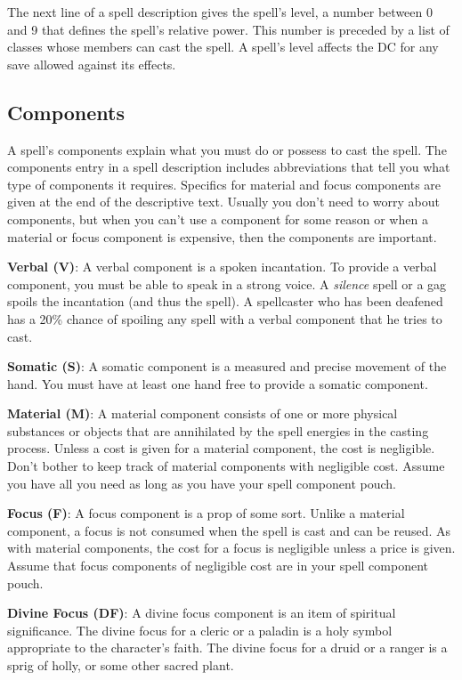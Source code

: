 				
The next line of a spell description gives the spell's level, a number between 0 and 9 that defines the spell's relative power. This number is preceded by a list of classes whose members can cast the spell. A spell's level affects the DC for any save allowed against its effects.
				
\subsection{Components}

				
A spell's components explain what you must do or possess to cast the spell. The components entry in a spell description includes abbreviations that tell you what type of components it requires. Specifics for material and focus components are given at the end of the descriptive text. Usually you don't need to worry about components, but when you can't use a component for some reason or when a material or focus component is expensive, then the components are important.
				
\textbf{Verbal (V)}: A verbal component is a spoken incantation. To provide a verbal component, you must be able to speak in a strong voice. A \textit{silence }spell or a gag spoils the incantation (and thus the spell). A spellcaster who has been deafened has a 20\% chance of spoiling any spell with a verbal component that he tries to cast.
				
\textbf{Somatic (S)}: A somatic component is a measured and precise movement of the hand. You must have at least one hand free to provide a somatic component.
				
\textbf{Material (M)}: A material component consists of one or more physical substances or objects that are annihilated by the spell energies in the casting process. Unless a cost is given for a material component, the cost is negligible. Don't bother to keep track of material components with negligible cost. Assume you have all you need as long as you have your spell component pouch.
				
\textbf{Focus (F)}: A focus component is a prop of some sort. Unlike a material component, a focus is not consumed when the spell is cast and can be reused. As with material components, the cost for a focus is negligible unless a price is given. Assume that focus components of negligible cost are in your spell component pouch.
				
\textbf{Divine Focus (DF)}: A divine focus component is an item of spiritual significance. The divine focus for a cleric or a paladin is a holy symbol appropriate to the character's faith. The divine focus for a druid or a ranger is a sprig of holly, or some other sacred plant.
				
